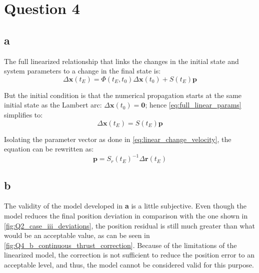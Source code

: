 \documentclass{report}
\begin{document}
\clearpage

\section*{Question 4}

\subsection*{a}

The full linearized relationship that links the changes in the initial state and system parameters to a change in the final state is:
\begin{equation} \label{eq:full_linear_params}
    \Delta \mathbf{x}(t_E) = \Phi(t_E, t_0)\Delta \mathbf{x}(t_0) + S(t_E)\mathbf{p}
\end{equation}

But the initial condition is that the numerical propagation starts at the same initial state as the Lambert arc: $\Delta \mathbf{x}(t_0) = \mathbf{0}$; hence \autoref{eq:full_linear_params} simplifies to:
\begin{equation}
    \Delta \mathbf{x}(t_E) = S(t_E)\mathbf{p}
\end{equation}

Isolating the parameter vector as done in \autoref{eq:linear_change_velocity}, the equation can be rewritten as:
\begin{equation}
    \mathbf{p} = S_r(t_E)^{-1} \Delta \mathbf{r}(t_E)
\end{equation}

\subsection*{b}

The validity of the model developed in \textbf{a} is a little subjective. 
Even though the model reduces the final position deviation in comparison with the one shown in \autoref{fig:Q2_case_iii_deviations}, the position residual is still much greater than what would be an acceptable value, as can be seen in \autoref{fig:Q4_b_continuous_thrust_correction}. 
Because of the limitations of the linearized model, the correction is not sufficient to reduce the position error to an acceptable level, and thus, the model cannot be considered valid for this purpose.
\end{document}
